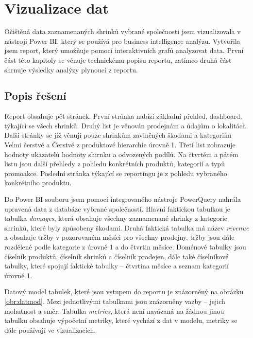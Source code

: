 \chapter{Vizualizace dat}
\label{ch:vizualizace}

Očištěná data zaznamenaných shrinků vybrané společnosti jsem vizualizovala v nástroji Power BI, který se používá pro business intelligence analýzu. Vytvořila jsem report, který umožňuje pomocí interaktivních grafů analyzovat data. První část této kapitoly se věnuje technickému popisu reportu, zatímco druhá část shrnuje výsledky analýzy plynoucí z reportu.

\section{Popis řešení}
\label{sec:vizualizace:popis}

Report obsahuje pět stránek. První stránka nabízí základní přehled, dashboard, týkající se všech shrinků. Druhý list je věnován prodejnám a údajům o lokalitách.
Další stránky se již věnují pouze shrinkům zaviněných škodami a kategoriím Velmi čerstvé a Čerstvé z produktové hierarchie úrovně 1. Třetí list zobrazuje hodnoty ukazatelů hodnoty shirnku a odvozených podílů. Na čtvrtém a pátém listu jsou další přehledy z pohledu konkrétních produktů, kategorií a typů promoakce. Poslední stránka týkající se reportingu je z pohledu vybraného konkrétního produktu.

Do Power BI souboru jsem pomocí integrovaného nástroje PowerQuery nahrála upravená data z databáze vybrané společnosti. Hlavní faktickou tabulkou je tabulka \emph{damages}, která obsahuje všechny zaznamenané shrinky z kategorie shrinků, které byly způsobeny škodami. Druhá faktická tabulka má název \emph{revenue} a obsahuje tržby v pozorovaném měsíci pro všechny prodejny, tržby jsou dále rozdělené podle kategorie z úrovně 1 a do čtvrtin měsíce. Doménové tabulky jsou číselník produktů, číselník shrinků a číselník prodejen, dále také číselníkové tabulky, které spojují faktické tabulky -- čtvrtina měsíce a seznam kategorií úrovně 1. 

Datový model tabulek, které jsou vstupem do reportu je znázorněný na obrázku \ref{obr:datmod}. Mezi jednotlivými tabulkami jsou znázorněny vazby -- jejich mohutnost a směr. Tabulka \emph{metrics}, která není navázaná na žádnou jinou tabulku obsahuje výpočetní metriky, které vychází z dat v modelu, metriky se dále používají ve vizualizacích.

